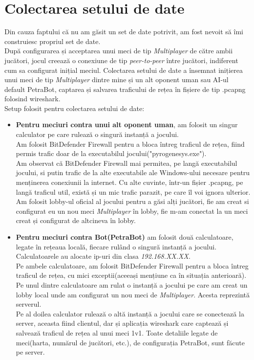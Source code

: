 \documentclass[12pt, a4paper, twoside, romanian]{teza-upb}
\begin{document}
       \section{Colectarea setului de date}
            Din cauza faptului că nu am găsit un set de date potrivit, am fost nevoit să îmi construiesc propriul set de date.\\
            După configurarea și acceptarea unui meci de tip \textit{Multiplayer} de către ambii jucători, jocul creează o conexiune de tip \textit{peer-to-peer} între jucători, indiferent cum sa configurat inițial meciul.
            Colectarea setului de date a însemnat inițierea unui meci de tip \textit{Multiplayer} dintre mine și un alt oponent uman sau AI-ul default PetraBot, captarea și salvarea traficului de rețea în fișiere de tip .pcapng folosind wireshark.\\
            Setup folosit pentru colectarea setului de date:
                \begin{itemize}
                    \item \textbf{Pentru meciuri contra unui alt oponent uman}, am folosit un singur calculator pe care rulează o singură instanță a jocului.\\
                    Am folosit BitDefender Firewall pentru a bloca întreg traficul de rețea, fiind permis trafic doar de la executabilul jocului("pyrogenesys.exe").\\
                    Am observat că BitDefender Firewall mai permitea, pe langă executabilul jocului, si putin trafic de la alte executabile ale Windows-ului necesare pentru menținerea conexiunii la internet. Cu alte cuvinte, într-un fișier .pcapng, pe langă traficul util, există și un mic trafic parazit, pe care îl voi ignora ulterior.\\
                    Am folosit lobby-ul oficial al jocului pentru a găsi alți jucători, fie am creat si configurat eu un nou meci \textit{Multiplayer} în lobby, fie m-am conectat la un meci creat și configurat de altcineva în lobby.

                    \item \textbf{Pentru meciuri contra Bot(PetraBot)} am folosit două calculatoare, legate în rețeaua locală, fiecare rulând o singură instanță a jocului. Calculatoarele au alocate ip-uri din clasa \textit{192.168.XX.XX}.\\
                    Pe ambele calculatoare, am folosit BitDefender Firewall pentru a bloca întreg traficul de rețea, cu mici exceptii(aceeași mențiune ca în situația anterioară).\\
                    Pe unul dintre calculatoare am rulat o instanță a jocului pe care am creat un lobby local unde am configurat un nou meci de \textit{Multiplayer}. Acesta reprezintă serverul.\\
                    Pe al doilea calculator rulează o altă instanță a jocului care se conectează la server, aceasta fiind clientul, dar și aplicația wireshark care captează și salvează traficul de rețea al unui meci 1v1.
                    Toate detaliile legate de meci(harta, numărul de jucători, etc.), de configurația PetraBot, sunt făcute pe server.
                \end{itemize}
\end{document}
